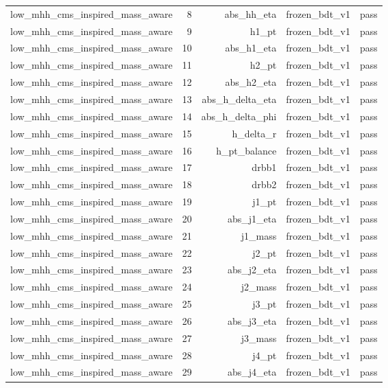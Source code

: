 \begin{table}[htbp]
\begin{tabular}{lrrrr}
low\_mhh\_cms\_inspired\_mass\_aware & 8 & abs\_hh\_eta & frozen\_bdt\_v1 & pass \\
low\_mhh\_cms\_inspired\_mass\_aware & 9 & h1\_pt & frozen\_bdt\_v1 & pass \\
low\_mhh\_cms\_inspired\_mass\_aware & 10 & abs\_h1\_eta & frozen\_bdt\_v1 & pass \\
low\_mhh\_cms\_inspired\_mass\_aware & 11 & h2\_pt & frozen\_bdt\_v1 & pass \\
low\_mhh\_cms\_inspired\_mass\_aware & 12 & abs\_h2\_eta & frozen\_bdt\_v1 & pass \\
low\_mhh\_cms\_inspired\_mass\_aware & 13 & abs\_h\_delta\_eta & frozen\_bdt\_v1 & pass \\
low\_mhh\_cms\_inspired\_mass\_aware & 14 & abs\_h\_delta\_phi & frozen\_bdt\_v1 & pass \\
low\_mhh\_cms\_inspired\_mass\_aware & 15 & h\_delta\_r & frozen\_bdt\_v1 & pass \\
low\_mhh\_cms\_inspired\_mass\_aware & 16 & h\_pt\_balance & frozen\_bdt\_v1 & pass \\
low\_mhh\_cms\_inspired\_mass\_aware & 17 & drbb1 & frozen\_bdt\_v1 & pass \\
low\_mhh\_cms\_inspired\_mass\_aware & 18 & drbb2 & frozen\_bdt\_v1 & pass \\
low\_mhh\_cms\_inspired\_mass\_aware & 19 & j1\_pt & frozen\_bdt\_v1 & pass \\
low\_mhh\_cms\_inspired\_mass\_aware & 20 & abs\_j1\_eta & frozen\_bdt\_v1 & pass \\
low\_mhh\_cms\_inspired\_mass\_aware & 21 & j1\_mass & frozen\_bdt\_v1 & pass \\
low\_mhh\_cms\_inspired\_mass\_aware & 22 & j2\_pt & frozen\_bdt\_v1 & pass \\
low\_mhh\_cms\_inspired\_mass\_aware & 23 & abs\_j2\_eta & frozen\_bdt\_v1 & pass \\
low\_mhh\_cms\_inspired\_mass\_aware & 24 & j2\_mass & frozen\_bdt\_v1 & pass \\
low\_mhh\_cms\_inspired\_mass\_aware & 25 & j3\_pt & frozen\_bdt\_v1 & pass \\
low\_mhh\_cms\_inspired\_mass\_aware & 26 & abs\_j3\_eta & frozen\_bdt\_v1 & pass \\
low\_mhh\_cms\_inspired\_mass\_aware & 27 & j3\_mass & frozen\_bdt\_v1 & pass \\
low\_mhh\_cms\_inspired\_mass\_aware & 28 & j4\_pt & frozen\_bdt\_v1 & pass \\
low\_mhh\_cms\_inspired\_mass\_aware & 29 & abs\_j4\_eta & frozen\_bdt\_v1 & pass \\

\end{tabular}
\end{table}
